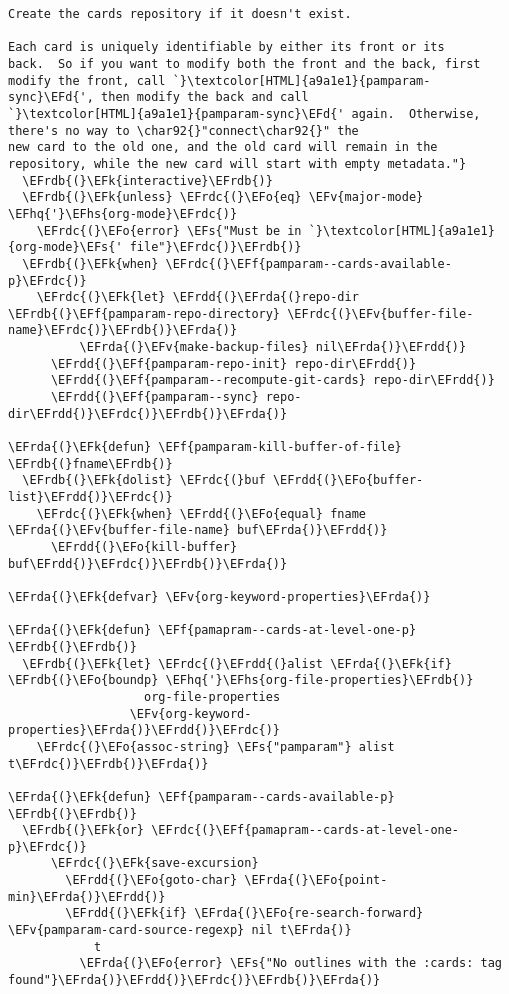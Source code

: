 \documentclass[a4wide,10pt]{article}
\newcommand{\EFs}[1]{\textcolor{EFs}{#1}} %
\newcommand{\EFd}[1]{\textcolor{EFd}{#1}} %
\newcommand{\EFk}[1]{\textcolor{EFk}{#1}} %
\newcommand{\EFf}[1]{\textcolor{EFf}{#1}} %
\newcommand{\EFv}[1]{\textcolor{EFv}{#1}} %
\newcommand{\EFo}[1]{\textcolor{EFo}{#1}} %
\newcommand{\EFhq}[1]{\textcolor{EFhq}{#1}} %
\newcommand{\EFhs}[1]{\textcolor{EFhs}{#1}} %
\newcommand{\EFrda}[1]{\textcolor{EFrda}{#1}} %
\newcommand{\EFrdb}[1]{\textcolor{EFrdb}{#1}} %
\newcommand{\EFrdc}[1]{\textcolor{EFrdc}{#1}} %
\newcommand{\EFrdd}[1]{\textcolor{EFrdd}{#1}} %
\begin{document}
\begin{Code}
\begin{Verbatim}
Create the cards repository if it doesn't exist.

Each card is uniquely identifiable by either its front or its
back.  So if you want to modify both the front and the back, first
modify the front, call `}\textcolor[HTML]{a9a1e1}{pamparam-sync}\EFd{', then modify the back and call
`}\textcolor[HTML]{a9a1e1}{pamparam-sync}\EFd{' again.  Otherwise, there's no way to \char92{}"connect\char92{}" the
new card to the old one, and the old card will remain in the
repository, while the new card will start with empty metadata."}
  \EFrdb{(}\EFk{interactive}\EFrdb{)}
  \EFrdb{(}\EFk{unless} \EFrdc{(}\EFo{eq} \EFv{major-mode} \EFhq{'}\EFhs{org-mode}\EFrdc{)}
    \EFrdc{(}\EFo{error} \EFs{"Must be in `}\textcolor[HTML]{a9a1e1}{org-mode}\EFs{' file"}\EFrdc{)}\EFrdb{)}
  \EFrdb{(}\EFk{when} \EFrdc{(}\EFf{pamparam--cards-available-p}\EFrdc{)}
    \EFrdc{(}\EFk{let} \EFrdd{(}\EFrda{(}repo-dir \EFrdb{(}\EFf{pamparam-repo-directory} \EFrdc{(}\EFv{buffer-file-name}\EFrdc{)}\EFrdb{)}\EFrda{)}
          \EFrda{(}\EFv{make-backup-files} nil\EFrda{)}\EFrdd{)}
      \EFrdd{(}\EFf{pamparam-repo-init} repo-dir\EFrdd{)}
      \EFrdd{(}\EFf{pamparam--recompute-git-cards} repo-dir\EFrdd{)}
      \EFrdd{(}\EFf{pamparam--sync} repo-dir\EFrdd{)}\EFrdc{)}\EFrdb{)}\EFrda{)}

\EFrda{(}\EFk{defun} \EFf{pamparam-kill-buffer-of-file} \EFrdb{(}fname\EFrdb{)}
  \EFrdb{(}\EFk{dolist} \EFrdc{(}buf \EFrdd{(}\EFo{buffer-list}\EFrdd{)}\EFrdc{)}
    \EFrdc{(}\EFk{when} \EFrdd{(}\EFo{equal} fname \EFrda{(}\EFv{buffer-file-name} buf\EFrda{)}\EFrdd{)}
      \EFrdd{(}\EFo{kill-buffer} buf\EFrdd{)}\EFrdc{)}\EFrdb{)}\EFrda{)}

\EFrda{(}\EFk{defvar} \EFv{org-keyword-properties}\EFrda{)}

\EFrda{(}\EFk{defun} \EFf{pamapram--cards-at-level-one-p} \EFrdb{(}\EFrdb{)}
  \EFrdb{(}\EFk{let} \EFrdc{(}\EFrdd{(}alist \EFrda{(}\EFk{if} \EFrdb{(}\EFo{boundp} \EFhq{'}\EFhs{org-file-properties}\EFrdb{)}
                   org-file-properties
                 \EFv{org-keyword-properties}\EFrda{)}\EFrdd{)}\EFrdc{)}
    \EFrdc{(}\EFo{assoc-string} \EFs{"pamparam"} alist t\EFrdc{)}\EFrdb{)}\EFrda{)}

\EFrda{(}\EFk{defun} \EFf{pamparam--cards-available-p} \EFrdb{(}\EFrdb{)}
  \EFrdb{(}\EFk{or} \EFrdc{(}\EFf{pamapram--cards-at-level-one-p}\EFrdc{)}
      \EFrdc{(}\EFk{save-excursion}
        \EFrdd{(}\EFo{goto-char} \EFrda{(}\EFo{point-min}\EFrda{)}\EFrdd{)}
        \EFrdd{(}\EFk{if} \EFrda{(}\EFo{re-search-forward} \EFv{pamparam-card-source-regexp} nil t\EFrda{)}
            t
          \EFrda{(}\EFo{error} \EFs{"No outlines with the :cards: tag found"}\EFrda{)}\EFrdd{)}\EFrdc{)}\EFrdb{)}\EFrda{)}


\end{Verbatim}
\end{Code}
\end{document}
